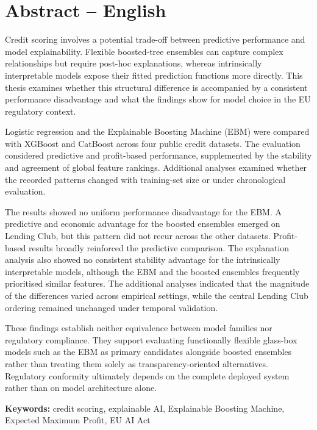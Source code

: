 \section*{Abstract -- English}

Credit scoring involves a potential trade-off between predictive performance and model explainability. Flexible boosted-tree ensembles can capture complex relationships but require post-hoc explanations, whereas intrinsically interpretable models expose their fitted prediction functions more directly. This thesis examines whether this structural difference is accompanied by a consistent performance disadvantage and what the findings show for model choice in the EU regulatory context.

Logistic regression and the Explainable Boosting Machine (EBM) were compared with XGBoost and CatBoost across four public credit datasets. The evaluation considered predictive and profit-based performance, supplemented by the stability and agreement of global feature rankings. Additional analyses examined whether the recorded patterns changed with training-set size or under chronological evaluation.

The results showed no uniform performance disadvantage for the EBM. A predictive and economic advantage for the boosted ensembles emerged on Lending Club, but this pattern did not recur across the other datasets. Profit-based results broadly reinforced the predictive comparison. The explanation analysis also showed no consistent stability advantage for the intrinsically interpretable models, although the EBM and the boosted ensembles frequently prioritised similar features. The additional analyses indicated that the magnitude of the differences varied across empirical settings, while the central Lending Club ordering remained unchanged under temporal validation.

These findings establish neither equivalence between model families nor regulatory compliance. They support evaluating functionally flexible glass-box models such as the EBM as primary candidates alongside boosted ensembles rather than treating them solely as transparency-oriented alternatives. Regulatory conformity ultimately depends on the complete deployed system rather than on model architecture alone.

\textbf{Keywords:} credit scoring, explainable AI, Explainable Boosting Machine, Expected Maximum Profit, EU AI Act


